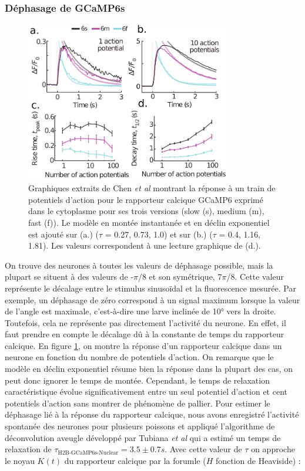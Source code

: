 \subsubsection{Déphasage de GCaMP6s}

\begin{figure}[b!]
    \centering
    \includegraphics[width=0.8\textwidth]{./files/chen2013_GCaMP6.svg.png}
    \caption{Graphiques extraits de Chen \emph{et al} \cite{chen_ultrasensitive_2013}
    montrant la réponse à un train de potentiels d'action pour le rapporteur calcique GCaMP6 exprimé dans le cytoplasme pour ses trois versions (slow (s), medium (m), fast (f)). Le modèle en montée instantanée et en déclin exponentiel est ajouté sur (a.) ($\tau$ = 0.27, 0.73, 1.0) et sur (b.) ($\tau$ = 0.4, 1.16, 1.81). Les valeurs correspondent à une lecture graphique de (d.). 
    \label{FIGcalciumkernel}} 
    \end{figure}

On trouve des neurones à toutes les valeurs de déphasage possible, mais la plupart se situent à des valeurs de -$\pi$/8 et son symétrique, 7$\pi$/8. Cette valeur représente le décalage entre le stimulus sinusoïdal et la fluorescence mesurée. Par exemple, un déphasage de zéro correspond à un signal maximum lorsque la valeur de l'angle est maximale, c'est-à-dire une larve inclinée de 10° vers la droite. Toutefois, cela ne représente pas directement l'activité du neurone. En effet, il faut prendre en compte le décalage dû à la constante de temps du rapporteur calcique. En figure \ref{FIGcalciumkernel}, on montre la réponse d'un rapporteur calcique dans un neurone en fonction du nombre de potentiels d'action. On remarque que le modèle en déclin exponentiel résume bien la réponse dans la plupart des cas, on peut donc ignorer le temps de montée. Cependant, le temps de relaxation caractéristique évolue significativement entre un seul potentiel d'action et cent potentiels d'action sans montrer de phénomène de pallier. Pour estimer le déphasage lié à la réponse du rapporteur calcique, nous avons enregistré l'activité spontanée des neurones pour plusieurs poissons et appliqué l'algorithme de déconvolution aveugle développé par Tubiana \emph{et al} \cite{tubiana_blind_2017} qui a estimé un temps de relaxation de $\tau_\text{H2B-GCaMP6s-Nuclear} = 3.5 \pm 0.7 s$. Avec cette valeur de $\tau$ on approche le noyau $K(t)$ du rapporteur calcique par la forumle ($H$ fonction de Heaviside) :

